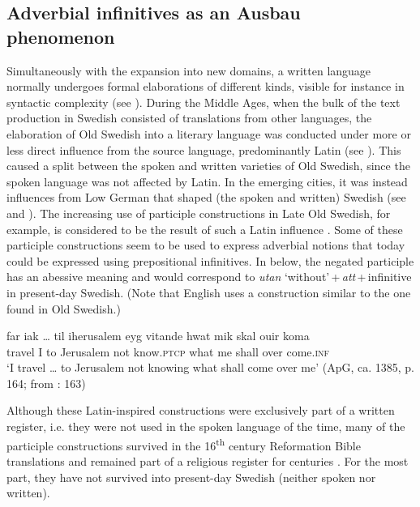 \documentclass[output=paper]{langscibook}
\begin{document}
\subsection{Adverbial infinitives as an Ausbau phenomenon}\label{sec:kalm:5.2}


Simultaneously with the expansion into new domains, a written language normally undergoes formal elaborations of different kinds, visible for instance in syntactic complexity (see \cites[38--39]{Fischer2007}[]{Kloss1967}). During the Middle Ages, when the bulk of the text production in Swedish consisted of translations from other languages, the elaboration of Old Swedish into a literary language was conducted under more or less direct influence from the source language, predominantly Latin (see \citealt{Wollin1981,Wollin1983,Hoder2009, Hoder2010}). This caused a split between the spoken and written varieties of Old Swedish, since the spoken language was not affected by Latin. In the emerging cities, it was instead influences from Low German that shaped (the spoken and written) Swedish (see  and ). The increasing use of participle constructions in Late Old Swedish, for example, is considered to be the result of such a Latin influence \citep{Ahlberg1942,Hoder2010}. Some of these participle constructions seem to be used to express adverbial notions that today could be expressed using prepositional infinitives. In  below, the negated participle has an abessive meaning and would correspond to \textit{utan} ‘without’\,+\,\textit{att}\,+\,infinitive in present-day Swedish. (Note that English uses a construction similar to the one found in Old Swedish.)


\ea 
\label{ex:kalm:33}
 \gll far {iak …} til iherusalem eyg vitande hwat mik skal ouir koma\\ 
travel I to Jerusalem not know.\textsc{ptcp} what me shall over come.\textsc{inf}\\
 \glt ‘I travel … to Jerusalem not knowing what shall come over me’ (ApG, ca. 1385, p. 164; from \citealt{Ahlberg1942}: 163)
\z


Although these Latin-inspired constructions were exclusively part of a written register, i.e. they were not used in the spoken language of the time, many of the participle constructions survived in the 16\textsuperscript{th} century Reformation Bible translations and remained part of a religious register for centuries \citep[17–19]{Stahle1970}. For the most part, they have not survived into present-day Swedish (neither spoken nor written). 
\end{document}
